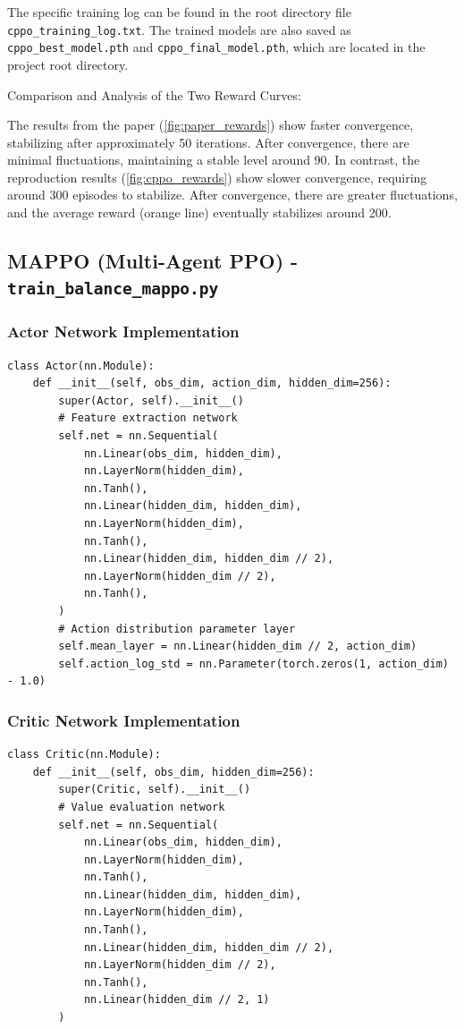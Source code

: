 \documentclass[12pt]{article}
\begin{document}
The specific training log can be found in the root directory file \texttt{cppo\_training\_log.txt}. The trained models are also saved as \texttt{cppo\_best\_model.pth} and \texttt{cppo\_final\_model.pth}, which are located in the project root directory.

Comparison and Analysis of the Two Reward Curves:

The results from the paper (\ref{fig:paper_rewards}) show faster convergence, stabilizing after approximately 50 iterations. After convergence, there are minimal fluctuations, maintaining a stable level around 90. In contrast, the reproduction results (\ref{fig:cppo_rewards}) show slower convergence, requiring around 300 episodes to stabilize. After convergence, there are greater fluctuations, and the average reward (orange line) eventually stabilizes around 200.

\subsection{MAPPO (Multi-Agent PPO) - \texttt{train\_balance\_mappo.py}}

\subsubsection{Actor Network Implementation}

\begin{verbatim}
class Actor(nn.Module):
    def __init__(self, obs_dim, action_dim, hidden_dim=256):
        super(Actor, self).__init__()
        # Feature extraction network
        self.net = nn.Sequential(
            nn.Linear(obs_dim, hidden_dim),
            nn.LayerNorm(hidden_dim),
            nn.Tanh(),
            nn.Linear(hidden_dim, hidden_dim),
            nn.LayerNorm(hidden_dim),
            nn.Tanh(),
            nn.Linear(hidden_dim, hidden_dim // 2),
            nn.LayerNorm(hidden_dim // 2),
            nn.Tanh(),
        )
        # Action distribution parameter layer
        self.mean_layer = nn.Linear(hidden_dim // 2, action_dim)
        self.action_log_std = nn.Parameter(torch.zeros(1, action_dim) - 1.0)
\end{verbatim}

\subsubsection{Critic Network Implementation}

\begin{verbatim}
class Critic(nn.Module):
    def __init__(self, obs_dim, hidden_dim=256):
        super(Critic, self).__init__()
        # Value evaluation network
        self.net = nn.Sequential(
            nn.Linear(obs_dim, hidden_dim),
            nn.LayerNorm(hidden_dim),
            nn.Tanh(),
            nn.Linear(hidden_dim, hidden_dim),
            nn.LayerNorm(hidden_dim),
            nn.Tanh(),
            nn.Linear(hidden_dim, hidden_dim // 2),
            nn.LayerNorm(hidden_dim // 2),
            nn.Tanh(),
            nn.Linear(hidden_dim // 2, 1)
        )
\end{verbatim}
\end{document}

